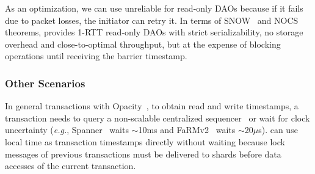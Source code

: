 
As an optimization, we can use unreliable \sys{} for read-only DAOs because if it fails due to packet losses, the initiator can retry it.
In terms of SNOW~\cite{lu2016snow} and NOCS~\cite{lu2020performance} theorems, \sys{} provides 1-RTT read-only DAOs with strict serializability, no storage overhead and close-to-optimal throughput, but at the expense of blocking operations until receiving the barrier timestamp.








\subsubsection{Other Scenarios}

In general transactions with Opacity~\cite{shamis2019fast}, to obtain read and write timestamps, a transaction needs to query a non-scalable centralized sequencer~\cite{dragojevic2015no,kaminsky2016design} or wait for clock uncertainty (\textit{e.g.}, Spanner~\cite{corbett2013spanner} waits $\sim$10ms and FaRMv2~\cite{shamis2019fast} waits $\sim$20$\mu$s). \sys{} can use local time as transaction timestamps directly without waiting because lock messages of previous transactions must be delivered to shards before data accesses of the current transaction.

